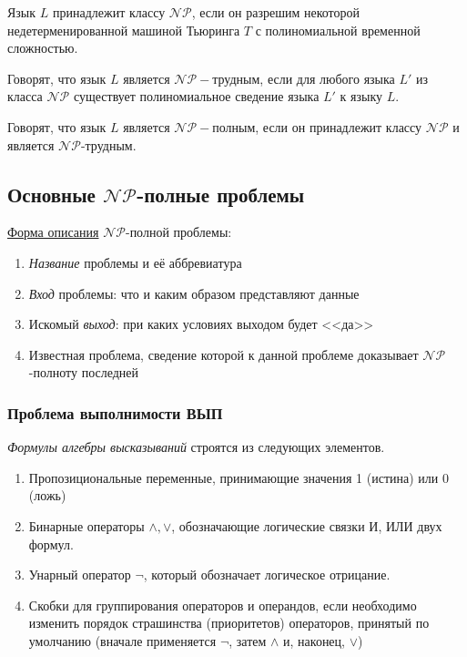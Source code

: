 \dftion Язык $L$ принадлежит классу $\mathscr{NP}$, если он разрешим некоторой недетерменированной машиной Тьюринга $T$ с полиномиальной временной сложностью.

\dftion Говорят, что язык $L$ является $\mathscr{NP}-\text{трудным}$, если для любого языка $L'$ из класса $\mathscr{NP}$ существует полиномиальное сведение языка $L'$ к языку $L$.

\dftion Говорят, что язык $L$ является $\mathscr{NP}-\textbf{полным}$, если он принадлежит классу $\mathscr{NP}$ и является $\mathscr{NP}\text{-трудным}$.

\subsection{Основные $\mathscr{NP}$-полные проблемы}
\underline{Форма описания} $\mathscr{NP}$-полной проблемы:

\begin{enumerate}
    \item \textit{Название} проблемы и её аббревиатура
    \item \textit{Вход} проблемы: что и каким образом представляют данные
    \item Искомый \textit{выход}: при каких условиях выходом будет <<да>>
    \item Известная проблема, сведение которой к данной проблеме доказывает $\mathscr{NP}$-полноту последней
\end{enumerate}

\subsubsection{Проблема выполнимости ВЫП}
\textit{Формулы алгебры высказываний} строятся из следующих элементов.

\begin{enumerate}
    \item Пропозициональные переменные, принимающие значения 1 (истина) или 0 (ложь)
    \item Бинарные операторы $\land, \lor$, обозначающие логические связки И, ИЛИ двух формул.
    \item Унарный оператор $\lnot$, который обозначает логическое отрицание.
    \item Скобки для группирования операторов и операндов, если необходимо изменить порядок страшинства (приоритетов) операторов, принятый по умолчанию (вначале применяется $\lnot$, затем $\land$ и, наконец, $\lor$)
\end{enumerate}


